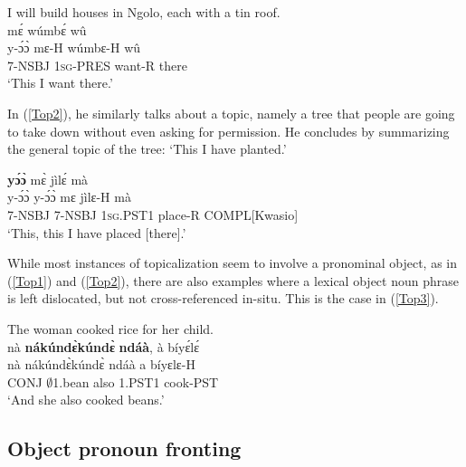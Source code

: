 \begin{exe} 
\ex\label{Top1} I will build houses in Ngolo, each with a tin roof.\\
   mɛ́ wúmbɛ́ wû\\
        y-ɔ́ɔ̀ mɛ-H wúmbɛ-H wû\\
         7-NSBJ 1\textsc{sg}-PRES want-R there\\
    \trans `This I want there.'
\end{exe}

In (\ref{Top2}), he similarly talks about a topic, namely a tree that people are going to take down without even asking for permission. He concludes by summarizing the general topic of the tree: `This I have planted.'

\begin{exe} 
\ex\label{Top2} 
   {\bfseries yɔ́ɔ̀} mɛ̀ jìlɛ́ mà \\
       y-ɔ́ɔ̀ y-ɔ́ɔ̀ mɛ jìlɛ-H mà \\
      7-NSBJ 7-NSBJ 1\textsc{sg}.PST1 place-R COMPL[Kwasio]    \\
    \trans `This, this I have placed [there].'
\end{exe}

While most instances of topicalization seem to involve a pronominal object, as in (\ref{Top1}) and (\ref{Top2}), there are also examples where a lexical object noun phrase is left dislocated, but not cross-referenced in-situ. This is the case in (\ref{Top3}).

\begin{exe} 
\ex\label{Top3} The woman cooked rice for her child.\\
   \glll nà {\bfseries nákúndɛ̀kúndɛ̀} {\bfseries ndáà}, à bíyɛ́lɛ́\\
           nà nákúndɛ̀kúndɛ̀ ndáà a bíyɛlɛ-H\\
       CONJ $\emptyset$1.bean also 1.PST1 cook-PST\\
    \trans `And she also cooked beans.'
\end{exe}











\subsection{Object pronoun fronting}
\label{sec:OBJfront}

